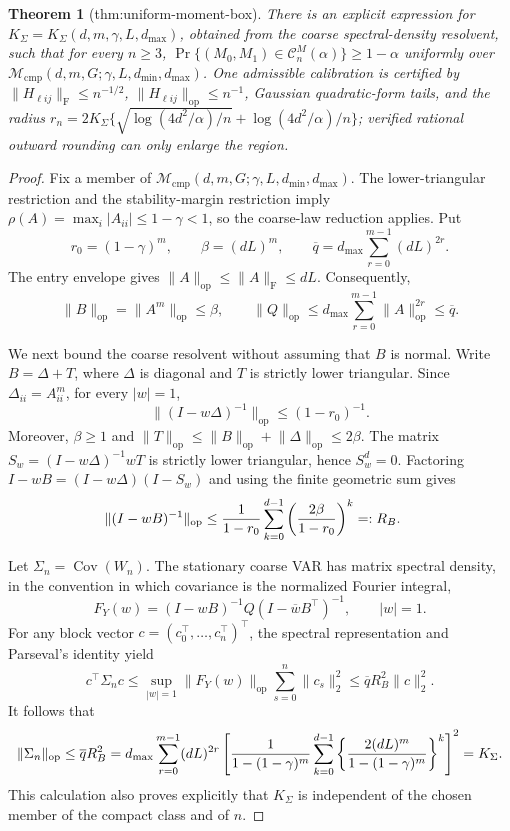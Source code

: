 \documentclass{article}
\newtheorem{theorem}{Theorem}
\begin{document}
\begin{theorem}[thm:uniform-moment-box]\label{thm:uniform-moment-box}
There is an explicit expression for \(K_\Sigma=K_\Sigma(d,m,\gamma,L,d_{\max})\), obtained from the coarse spectral-density resolvent, such that for every \(n\ge3\), \(\Pr\{(M_0,M_1)\in\mathcal C_n^M(\alpha)\}\ge1-\alpha\) uniformly over \(\mathcal M_{\mathrm{cmp}}(d,m,G;\gamma,L,d_{\min},d_{\max})\). One admissible calibration is certified by \(\|H_{\ell ij}\|_{\mathrm F}\le n^{-1/2}\), \(\|H_{\ell ij}\|_{\mathrm{op}}\le n^{-1}\), Gaussian quadratic-form tails, and the radius \(r_n=2K_\Sigma\{\sqrt{\log(4d^2/\alpha)/n}+\log(4d^2/\alpha)/n\}\); verified rational outward rounding can only enlarge the region.
\end{theorem}
\begin{proof}
Fix a member of \(\mathcal M_{\mathrm{cmp}}(d,m,G;\gamma,L,d_{\min},d_{\max})\).
The lower-triangular restriction and the stability-margin restriction imply
\(\rho(A)=\max_i|A_{ii}|\le1-\gamma<1\), so the coarse-law reduction applies.
Put
\[
 r_0=(1-\gamma)^m,
 \qquad \beta=(dL)^m,
 \qquad
 \overline q=d_{\max}\sum_{r=0}^{m-1}(dL)^{2r}.
\]
The entry envelope gives
\(\lVert A\rVert_{\mathrm{op}}\le\lVert A\rVert_{\mathrm F}\le dL\).
Consequently,
\[
 \lVert B\rVert_{\mathrm{op}}=\lVert A^m\rVert_{\mathrm{op}}\le\beta,
 \qquad
 \lVert Q\rVert_{\mathrm{op}}
 \le d_{\max}\sum_{r=0}^{m-1}\lVert A\rVert_{\mathrm{op}}^{2r}
 \le\overline q.
\]

We next bound the coarse resolvent without assuming that \(B\) is normal.
Write \(B=\Delta+T\), where \(\Delta\) is diagonal and \(T\) is strictly
lower triangular. Since \(\Delta_{ii}=A_{ii}^m\), for every \(|w|=1\),
\[
 \lVert(I-w\Delta)^{-1}\rVert_{\mathrm{op}}
 \le(1-r_0)^{-1}.
\]
Moreover, \(\beta\ge1\) and
\(\lVert T\rVert_{\mathrm{op}}\le\lVert B\rVert_{\mathrm{op}}+
\lVert\Delta\rVert_{\mathrm{op}}\le2\beta\). The matrix
\(S_w=(I-w\Delta)^{-1}wT\) is strictly lower triangular, hence
\(S_w^d=0\). Factoring \(I-wB=(I-w\Delta)(I-S_w)\) and using the finite
geometric sum gives
\[
 \begin{split}
 \lVert(I-wB)^{-1}\rVert_{\mathrm{op}}
 &\le {1\over1-r_0}\sum_{k=0}^{d-1}
 \left({2\beta\over1-r_0}\right)^k
 =:R_B.
 \end{split}
\]

Let \(\Sigma_n=\operatorname{Cov}(W_n)\). The stationary coarse VAR has
matrix spectral density, in the convention in which covariance is the
normalized Fourier integral,
\[
 F_Y(w)=(I-wB)^{-1}Q(I-\overline w B^\top)^{-1},
 \qquad |w|=1.
\]
For any block vector \(c=(c_0^\top,\ldots,c_n^\top)^\top\), the spectral
representation and Parseval's identity yield
\[
 c^\top\Sigma_nc
 \le \sup_{|w|=1}\lVert F_Y(w)\rVert_{\mathrm{op}}
       \sum_{s=0}^n\lVert c_s\rVert_2^2
 \le \overline q R_B^2\lVert c\rVert_2^2.
\]
It follows that
\[
 \lVert\Sigma_n\rVert_{\mathrm{op}}\le \overline q R_B^2
 =d_{\max}\sum_{r=0}^{m-1}(dL)^{2r}
 \left[
 {1\over1-(1-\gamma)^m}
 \sum_{k=0}^{d-1}
 \left\{{2(dL)^m\over1-(1-\gamma)^m}\right\}^{k}
 \right]^2
 =K_\Sigma.
\]
This calculation also proves explicitly that \(K_\Sigma\) is independent of
the chosen member of the compact class and of \(n\).


\end{proof}
\end{document}
